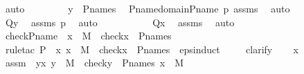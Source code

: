 \begin{isabellebody}
\ auto\ \isanewline
\ \ \ \ \isamarkupfalse%
\ \isamarkupfalse%
\ {\isachardoublequoteopen}y\ {\isasymin}\ P{\isacharunderscore}{\kern0pt}names{\isachardoublequoteclose}\ \isamarkupfalse%
\ P{\isacharunderscore}{\kern0pt}name{\isacharunderscore}{\kern0pt}domain{\isacharunderscore}{\kern0pt}P{\isacharunderscore}{\kern0pt}name\ p{}{}\ assms\ \isamarkupfalse%
\ auto\ \isanewline
\ \ \ \ \isamarkupfalse%
\ \isamarkupfalse%
\ {\isachardoublequoteopen}Q{\isacharparenleft}{\kern0pt}y{\isacharparenright}{\kern0pt}{\isachardoublequoteclose}\ \isamarkupfalse%
\ assms\ p{}\ \isamarkupfalse%
\ auto\ \isanewline
\ \ \isamarkupfalse%
\ \isanewline
\ \ \isamarkupfalse%
\ \isamarkupfalse%
\ {\isachardoublequoteopen}Q{\isacharparenleft}{\kern0pt}x{\isacharparenright}{\kern0pt}{\isachardoublequoteclose}\ \isamarkupfalse%
\ assms\ \isamarkupfalse%
\ auto\ \isanewline
{}\isamarkupfalse%
%
\endisatagproof
{\isafoldproof}%
%
\isadelimproof
\isanewline
%
\endisadelimproof
\ \ \isanewline
\isanewline
{}\isamarkupfalse%
\ check{\isacharunderscore}{\kern0pt}P{\isacharunderscore}{\kern0pt}name\ {\isacharcolon}{\kern0pt}\ {\isachardoublequoteopen}x\ {\isasymin}\ M\ {\isasymlongrightarrow}\ check{\isacharparenleft}{\kern0pt}x{\isacharparenright}{\kern0pt}\ {\isasymin}\ P{\isacharunderscore}{\kern0pt}names{\isachardoublequoteclose}\ \isanewline
%
\isadelimproof
\ \ %
\endisadelimproof
%
\isatagproof
{}\isamarkupfalse%
\ {\isacharparenleft}{\kern0pt}rule{\isacharunderscore}{\kern0pt}tac\ P\ {\isacharequal}{\kern0pt}\ {\isachardoublequoteopen}{\isasymlambda}x{\isachardot}{\kern0pt}\ x\ {\isasymin}\ M\ {\isasymlongrightarrow}\ check{\isacharparenleft}{\kern0pt}x{\isacharparenright}{\kern0pt}\ {\isasymin}\ P{\isacharunderscore}{\kern0pt}names{\isachardoublequoteclose}\ \ eps{\isacharunderscore}{\kern0pt}induct{\isacharparenright}{\kern0pt}\ \isanewline
\ \ \isamarkupfalse%
\ {\isacharparenleft}{\kern0pt}clarify{\isacharparenright}{\kern0pt}\isanewline
{}\isamarkupfalse%
{\isacharminus}{\kern0pt}\isanewline
\ \ \isamarkupfalse%
\ x\ \isamarkupfalse%
\ assm\ {\isacharcolon}{\kern0pt}\ {\isachardoublequoteopen}{\isasymforall}y{\isasymin}x{\isachardot}{\kern0pt}\ y\ {\isasymin}\ M\ {\isasymlongrightarrow}\ check{\isacharparenleft}{\kern0pt}y{\isacharparenright}{\kern0pt}\ {\isasymin}\ P{\isacharunderscore}{\kern0pt}names{\isachardoublequoteclose}\ {\isachardoublequoteopen}x\ {\isasymin}\ M{\isachardoublequoteclose}\isanewline

\end{isabellebody}
